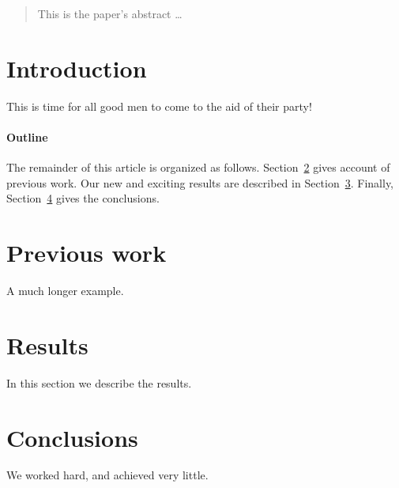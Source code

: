 \documentclass[12pt]{article}
\begin{document}
\maketitle

\begin{abstract}
This is the paper's abstract \ldots
\end{abstract}

\section{Introduction}
This is time for all good men to come to the aid of their party!

\paragraph{Outline}
The remainder of this article is organized as follows.
Section~\ref{previous work} gives account of previous work.
Our new and exciting results are described in Section~\ref{results}.
Finally, Section~\ref{conclusions} gives the conclusions.

\section{Previous work}\label{previous work}
A much longer \LaTeXe{} example.

\section{Results}\label{results}
In this section we describe the results.

\section{Conclusions}\label{conclusions}
We worked hard, and achieved very little.



\end{document}
